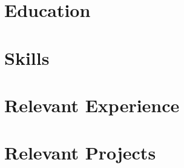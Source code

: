 \documentclass[letterpaper,10pt]{article}
\begin{document}


\vspace{-4mm} %
% 

\vspace{-3mm} %
\section{Education}


\vspace{-4mm} %

\section{Skills}
\vspace{-0.5mm} %


\vspace{-6mm} %
\section{Relevant Experience}
\resumeSubHeadingListStart
% 



% 
% 
% 
% 

\resumeSubHeadingListEnd

\vspace{-4.1mm} %

\section{Relevant Projects}
\resumeSubHeadingListStart



% 
% 
% 
% 
% 
% 
% 
% 
% 
% 
% 
% 
%  
%  

\resumeSubHeadingListEnd
% 
\end{document}
